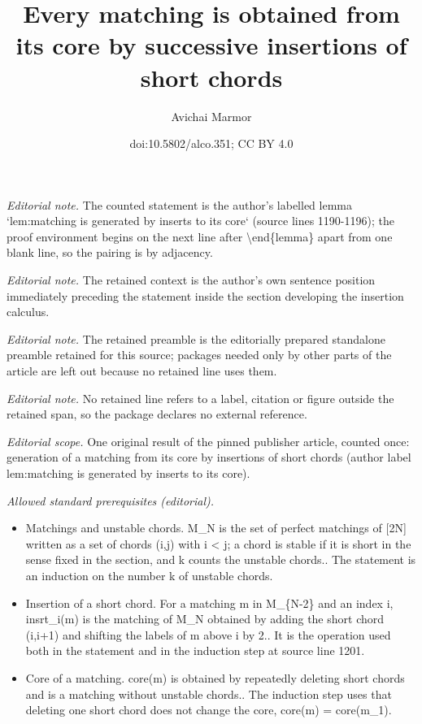 \documentclass[11pt]{article}
\title{Every matching is obtained from its core by successive insertions of short chords}
\author{Avichai Marmor}
\date{doi:10.5802/alco.351; CC BY 4.0}
\theoremstyle{definition}
\numberwithin{equation}{section}
\begin{document}
\maketitle
\noindent\textit{Editorial note.} The counted statement is the author's labelled lemma `lem:matching is generated by inserts to its core` (source lines 1190-1196); the proof environment begins on the next line after \textbackslash{}end\{lemma\} apart from one blank line, so the pairing is by adjacency.\par\medskip
\noindent\textit{Editorial note.} The retained context is the author's own sentence position immediately preceding the statement inside the section developing the insertion calculus.\par\medskip
\noindent\textit{Editorial note.} The retained preamble is the editorially prepared standalone preamble retained for this source; packages needed only by other parts of the article are left out because no retained line uses them.\par\medskip
\noindent\textit{Editorial note.} No retained line refers to a label, citation or figure outside the retained span, so the package declares no external reference.\par\medskip
\noindent\textit{Editorial scope.} One original result of the pinned publisher article, counted once: generation of a matching from its core by insertions of short chords (author label lem:matching is generated by inserts to its core).\par\medskip
\noindent\textit{Allowed standard prerequisites (editorial).}\begin{itemize}
\item Matchings and unstable chords. M\_N is the set of perfect matchings of [2N] written as a set of chords (i,j) with i < j; a chord is stable if it is short in the sense fixed in the section, and k counts the unstable chords.. The statement is an induction on the number k of unstable chords.
\item Insertion of a short chord. For a matching m in M\_\{N-2\} and an index i, insrt\_i(m) is the matching of M\_N obtained by adding the short chord (i,i+1) and shifting the labels of m above i by 2.. It is the operation used both in the statement and in the induction step at source line 1201.
\item Core of a matching. core(m) is obtained by repeatedly deleting short chords and is a matching without unstable chords.. The induction step uses that deleting one short chord does not change the core, core(m) = core(m\_1).
\end{itemize}\medskip
\end{document}
